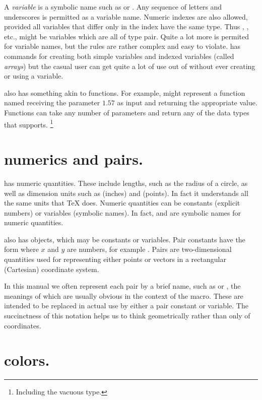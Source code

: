 \documentclass[letterpaper]{article}
\begin{document}
A \emph{variable} is a symbolic name such as  or
. Any sequence of letters and underscores is permitted
as a variable name. Numeric indexes are also allowed, provided all
variables that differ only in the index have the same type. Thus
, , etc., might be variables which are all of type pair.
Quite a lot more is permited for variable names, but the rules are
rather complex and easy to violate. \Mfp{} has commands for creating
both simple variables and indexed variables (called \emph{arrays}) but
the casual user can get quite a lot of use out of \mfp{} without ever
creating or using a \MF{} variable.

\CMF{} also has something akin to functions. For example, 
might represent a function named  receiving the parameter
$1.57$ as input and returning the appropriate value. Functions
can take any number of parameters and return any of the data types that
\MF{} supports.%
    \footnote{Including the vacuous type.}


\section{\CMF{} numerics and pairs.}\label{pairs}

\CMF{} has numeric quantities. These include lengths, such as the radius
of a circle, as well as dimension units such as  (inches)
and  (points). In fact it understands all the same units that
\TeX{} does. Numeric quantities can be constants (explicit numbers) or
variables (symbolic names). In fact,  and  are symbolic
names for numeric quantities.

\CMF{} also has  objects, which may be constants or variables.
Pair constants have the form  where $x$ and $y$ are
numbers, for example .  Pairs are two-dimensional quantities
used for representing either points or vectors in a rectangular
(Cartesian) coordinate system.

In this manual we often represent each pair by a brief name, such as
 or , the meanings of which are usually obvious in the
context of the macro. These are intended to be replaced in actual use by
either a pair constant or variable. The succinctness of this notation
helps us to think geometrically rather than only of coordinates.


\section{\CMP{} colors.}\label{MPcolors}
\end{document}
